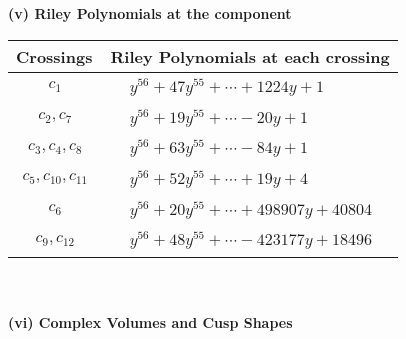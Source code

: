 \documentclass[1p]{elsarticle_modified}
\theoremstyle{definition}
\begin{document}
\newpage\renewcommand{\arraystretch}{1}
\flushleft \textbf{(v) Riley Polynomials at the component}\newline \\
\begin{tabular}{m{50pt}|m{274pt}}
Crossings & \hspace{64pt}Riley Polynomials at each crossing \\
\hline $$\begin{aligned}c_{1}\end{aligned}$$&$\begin{aligned}
&y^{56}+47 y^{55}+\cdots+1224 y+1
\end{aligned}$\\
\hline $$\begin{aligned}c_{2},c_{7}\end{aligned}$$&$\begin{aligned}
&y^{56}+19 y^{55}+\cdots-20 y+1
\end{aligned}$\\
\hline $$\begin{aligned}c_{3},c_{4},c_{8}\end{aligned}$$&$\begin{aligned}
&y^{56}+63 y^{55}+\cdots-84 y+1
\end{aligned}$\\
\hline $$\begin{aligned}c_{5},c_{10},c_{11}\end{aligned}$$&$\begin{aligned}
&y^{56}+52 y^{55}+\cdots+19 y+4
\end{aligned}$\\
\hline $$\begin{aligned}c_{6}\end{aligned}$$&$\begin{aligned}
&y^{56}+20 y^{55}+\cdots+498907 y+40804
\end{aligned}$\\
\hline $$\begin{aligned}c_{9},c_{12}\end{aligned}$$&$\begin{aligned}
&y^{56}+48 y^{55}+\cdots-423177 y+18496
\end{aligned}$\\
\hline
\end{tabular}\\~\\
\newpage\flushleft \textbf{(vi) Complex Volumes and Cusp Shapes}
\end{document}
